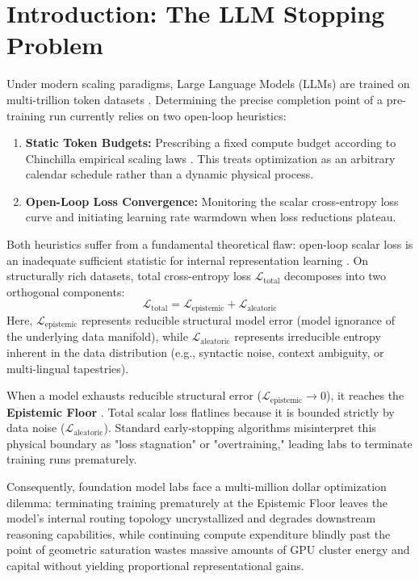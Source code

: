 \documentclass[11pt,twocolumn]{article}
\begin{document}
\section{Introduction: The LLM Stopping Problem}
Under modern scaling paradigms, Large Language Models (LLMs) are trained on multi-trillion token datasets \cite{chinchilla, vaswani2017}. Determining the precise completion point of a pre-training run currently relies on two open-loop heuristics:
\begin{enumerate}
    \item \textbf{Static Token Budgets:} Prescribing a fixed compute budget according to Chinchilla empirical scaling laws \cite{chinchilla}. This treats optimization as an arbitrary calendar schedule rather than a dynamic physical process.
    \item \textbf{Open-Loop Loss Convergence:} Monitoring the scalar cross-entropy loss curve and initiating learning rate warmdown when loss reductions plateau.
\end{enumerate}

Both heuristics suffer from a fundamental theoretical flaw: open-loop scalar loss is an inadequate sufficient statistic for internal representation learning \cite{slt, massif, solis2026zenodo22697472}. On structurally rich datasets, total cross-entropy loss $\mathcal{L}_{\text{total}}$ decomposes into two orthogonal components:
\begin{equation}
\mathcal{L}_{\text{total}} = \mathcal{L}_{\text{epistemic}} + \mathcal{L}_{\text{aleatoric}}
\end{equation}
Here, $\mathcal{L}_{\text{epistemic}}$ represents reducible structural model error (model ignorance of the underlying data manifold), while $\mathcal{L}_{\text{aleatoric}}$ represents irreducible entropy inherent in the data distribution (e.g., syntactic noise, context ambiguity, or multi-lingual tapestries).

When a model exhausts reducible structural error ($\mathcal{L}_{\text{epistemic}} \to 0$), it reaches the \textbf{Epistemic Floor} \cite{solis2026gci, solis2026zenodo22697472}. Total scalar loss flatlines because it is bounded strictly by data noise ($\mathcal{L}_{\text{aleatoric}}$). Standard early-stopping algorithms misinterpret this physical boundary as "loss stagnation" or "overtraining," leading labs to terminate training runs prematurely.

Consequently, foundation model labs face a multi-million dollar optimization dilemma: terminating training prematurely at the Epistemic Floor leaves the model's internal routing topology uncrystallized and degrades downstream reasoning capabilities, while continuing compute expenditure blindly past the point of geometric saturation wastes massive amounts of GPU cluster energy and capital without yielding proportional representational gains.
\end{document}
